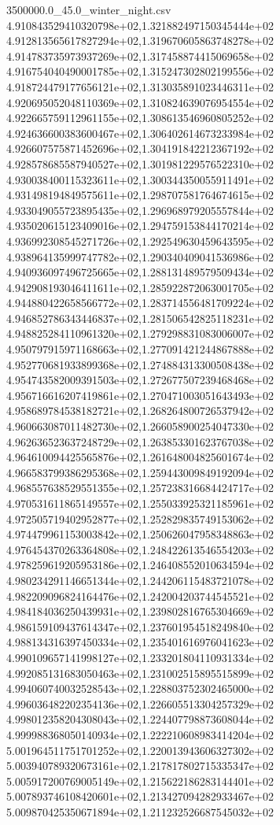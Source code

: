 \begin{filecontents*}{3500000.0_45.0_winter_night.csv}
4.910843529410320798e+02,1.321882497150345444e+02
4.912813565617827294e+02,1.319670605863748278e+02
4.914783735973937269e+02,1.317458874415069658e+02
4.916754040490001785e+02,1.315247302802199556e+02
4.918724479177656121e+02,1.313035891023446311e+02
4.920695052048110369e+02,1.310824639076954554e+02
4.922665759112961155e+02,1.308613546960805252e+02
4.924636600383600467e+02,1.306402614673233984e+02
4.926607575871452696e+02,1.304191842212367192e+02
4.928578685587940527e+02,1.301981229576522310e+02
4.930038400115323611e+02,1.300344350055911491e+02
4.931498194849575611e+02,1.298707581764674615e+02
4.933049055723895435e+02,1.296968979205557844e+02
4.935020615123409016e+02,1.294759153844170214e+02
4.936992308545271726e+02,1.292549630459643595e+02
4.938964135999747782e+02,1.290340409041536986e+02
4.940936097496725665e+02,1.288131489579509434e+02
4.942908193046411611e+02,1.285922872063001705e+02
4.944880422658566772e+02,1.283714556481709224e+02
4.946852786343446837e+02,1.281506542825118231e+02
4.948825284110961320e+02,1.279298831083006007e+02
4.950797915971168663e+02,1.277091421244867888e+02
4.952770681933899368e+02,1.274884313300508438e+02
4.954743582009391503e+02,1.272677507239468468e+02
4.956716616207419861e+02,1.270471003051643493e+02
4.958689784538182721e+02,1.268264800726537942e+02
4.960663087011482730e+02,1.266058900254047330e+02
4.962636523637248729e+02,1.263853301623767038e+02
4.964610094425565876e+02,1.261648004825601674e+02
4.966583799386295368e+02,1.259443009849192094e+02
4.968557638529551355e+02,1.257238316684424717e+02
4.970531611865149557e+02,1.255033925321185961e+02
4.972505719402952877e+02,1.252829835749153062e+02
4.974479961153003842e+02,1.250626047958348863e+02
4.976454370263364808e+02,1.248422613546554203e+02
4.978259619205953186e+02,1.246408552010634594e+02
4.980234291146651344e+02,1.244206115483721078e+02
4.982209096824164476e+02,1.242004203744545521e+02
4.984184036250439931e+02,1.239802816765304669e+02
4.986159109437614347e+02,1.237601954518249840e+02
4.988134316397450334e+02,1.235401616976041623e+02
4.990109657141998127e+02,1.233201804110931334e+02
4.992085131683050463e+02,1.231002515895515899e+02
4.994060740032528543e+02,1.228803752302465000e+02
4.996036482202354136e+02,1.226605513304257329e+02
4.998012358204308043e+02,1.224407798873608044e+02
4.999988368050140934e+02,1.222210608983414204e+02
5.001964511751701252e+02,1.220013943606327302e+02
5.003940789320673161e+02,1.217817802715335347e+02
5.005917200769005149e+02,1.215622186283144401e+02
5.007893746108420601e+02,1.213427094282933467e+02
5.009870425350671894e+02,1.211232526687545032e+02

\end{filecontents*}
